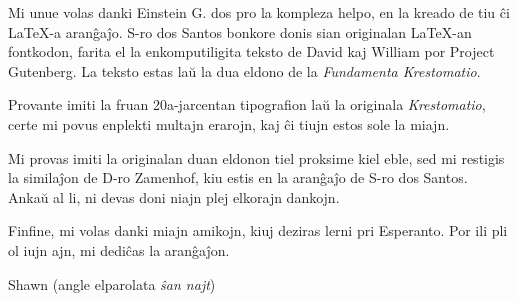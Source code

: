 \kolofono

Mi unue volas danki Einstein G. dos  pro la kompleza helpo, en la kreado de tiu ĉi \LaTeX{}-a aranĝaĵo.  S-ro dos Santos bonkore donis sian originalan \LaTeX{}-an fontkodon, farita el la enkomputiligita teksto de David  kaj William  por Project Gutenberg.  La teksto estas laŭ la dua eldono de la \emph{Fundamenta Krestomatio}.

Provante imiti la fruan 20a-jarcentan tipografion laŭ la originala \emph{Krestomatio}, certe mi povus enplekti multajn erarojn, kaj ĉi tiujn estos sole la miajn.

Mi provas imiti la originalan duan eldonon tiel proksime kiel eble, sed mi restigis la similaĵon de D-ro Zamenhof, kiu estis en la aranĝaĵo de S-ro dos Santos.  Ankaŭ al li, ni devas doni niajn plej elkorajn dankojn.

Finfine, mi volas danki miajn amikojn, kiuj deziras lerni pri Esperanto.  Por ili pli ol iujn ajn, mi dediĉas la aranĝaĵon.

\vspace{1em}

{\setlength{\parindent}{0em}
Shawn  (angle elparolata \emph{ŝan najt})\\
\hodiau}


